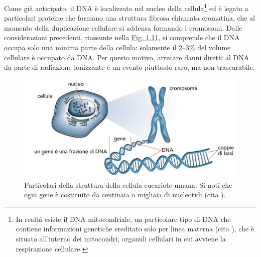 \documentclass[12pt,a4paper,twoside]{report}
\begin{document}
	Come già anticipato, il DNA è localizzato nel nucleo della cellula\footnote{In realtà esiste il DNA mitocondriale, un particolare tipo di DNA che contiene informazioni genetiche ereditato solo per linea materna (cita
	), che è situato all'interno dei mitocondri, organuli cellulari in cui avviene la respirazione cellulare.} ed è legato a particolari proteine che formano una struttura fibrosa chiamata cromatina, che al momento della duplicazione cellulare si addensa formando i cromosomi. Dalle considerazioni precedenti, riassunte nella \hyperref[fig:cell]{Fig. 1.11}, si comprende che il DNA occupa solo una minima parte della cellula: solamente il $2$--$3\%$ del volume cellulare è occupato da DNA. Per questo motivo, arrecare danni diretti al DNA da parte di radiazione ionizzante è un evento piuttosto raro, ma non trascurabile.
	\begin{figure}[H]
		\centering
		\includegraphics[width=0.9\linewidth]{cell.jpg}
		\caption{Particolari della struttura della cellula eucariote umana. Si noti che ogni gene è costituito da centinaia o migliaia di nucleotidi (cita
			).}
		\label{fig:cell}
	\end{figure}
\end{document}
